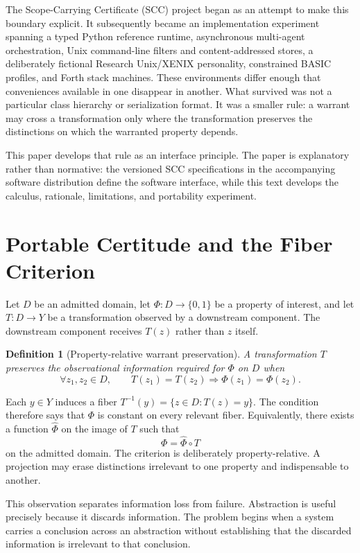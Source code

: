 \documentclass[11pt]{article}
\newtheorem{definition}{Definition}
\begin{document}
The Scope-Carrying Certificate (SCC) project began as an attempt to make this boundary explicit. It subsequently became an implementation experiment spanning a typed Python reference runtime, asynchronous multi-agent orchestration, Unix command-line filters and content-addressed stores, a deliberately fictional Research Unix/XENIX personality, constrained BASIC profiles, and Forth stack machines. These environments differ enough that conveniences available in one disappear in another. What survived was not a particular class hierarchy or serialization format. It was a smaller rule: a warrant may cross a transformation only where the transformation preserves the distinctions on which the warranted property depends.

This paper develops that rule as an interface principle. The paper is explanatory rather than normative: the versioned SCC specifications in the accompanying software distribution define the software interface, while this text develops the calculus, rationale, limitations, and portability experiment.

\section{Portable Certitude and the Fiber Criterion}
Let $D$ be an admitted domain, let $\Phi:D\to\{0,1\}$ be a property of interest, and let $T:D\to Y$ be a transformation observed by a downstream component. The downstream component receives $T(z)$ rather than $z$ itself.

\begin{definition}[Property-relative warrant preservation]
A transformation $T$ preserves the observational information required for $\Phi$ on $D$ when
\[
\forall z_1,z_2\in D,\qquad T(z_1)=T(z_2)\Longrightarrow \Phi(z_1)=\Phi(z_2).
\]
\end{definition}

Each $y\in Y$ induces a fiber $T^{-1}(y)=\{z\in D:T(z)=y\}$. The condition therefore says that $\Phi$ is constant on every relevant fiber. Equivalently, there exists a function $\widehat\Phi$ on the image of $T$ such that
\[
\Phi=\widehat\Phi\circ T
\]
on the admitted domain. The criterion is deliberately property-relative. A projection may erase distinctions irrelevant to one property and indispensable to another.

This observation separates information loss from failure. Abstraction is useful precisely because it discards information. The problem begins when a system carries a conclusion across an abstraction without establishing that the discarded information is irrelevant to that conclusion.
\end{document}
